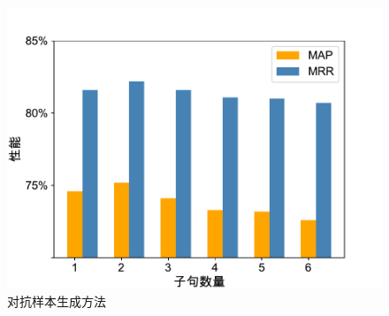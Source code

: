 \begin{figure}[h]
    \centering
      \includegraphics[width=0.9\columnwidth]{figure/fig3-2.pdf}
    \caption{对抗样本生成方法}
    \label{fig3-2}
\end{figure}